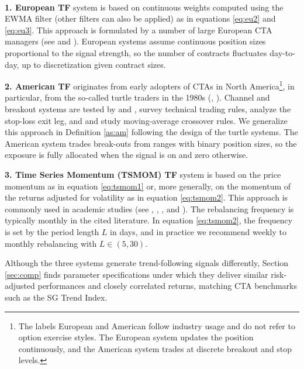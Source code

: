 \documentclass[hidelinks]{siamonline250211}
\begin{document}
\begin{definition} ~
	
	\textbf{1. European TF} system is based on continuous weights computed using the EWMA filter (other filters can also be applied) as in equations \eqref{eq:eu2} and \eqref{eq:eu3}. This approach is formulated by a number of large European CTA managers (see \cite{Bouchaud2017} and \cite{Baz2015}). European systems assume continuous position sizes proportional to the signal strength, so the number of contracts fluctuates day-to-day, up to discretization given contract sizes.
	
	\textbf{2. American TF} originates from early adopters of CTAs in North America\footnote{The labels European and American follow industry usage and do not refer to option exercise styles. The European system updates the position continuously, and the American system trades at discrete breakout and stop levels.}, in particular, from the so-called turtle traders in the 1980s (\citealp{Covel2009}, \citealp{Curtis2007}). Channel and breakout systems are tested by \cite{Lukac1988} and \cite{Szakmary2010}, \cite{ParkIrwin2007} survey technical trading rules, \cite{KaminskiLo2014} analyze the stop-loss exit leg, and \cite{LevinePedersen2016} and \cite{Brock1992} study moving-average crossover rules. 
	We generalize this approach in Definition \ref{as:am} following the design of the turtle systems. The American system trades break-outs from ranges with binary position sizes, so the exposure is fully allocated when the signal is on and zero otherwise. 
	
	
	\textbf{3. Time Series Momentum (TSMOM) TF} system is based on the price momentum as in equation \eqref{eq:tsmom1} or, more generally, on the momentum of the returns adjusted for volatility as in equation \eqref{eq:tsmom2}. This approach is commonly used in academic studies (see \cite{Moskowitz2012}, \cite{Hurst2013}, \cite{Baltas2015}, and \cite{Dudler2015}). The rebalancing frequency is typically monthly in the cited literature. In equation \eqref{eq:tsmom2}, the frequency is set by the period length $L$ in days, and in practice we recommend weekly to monthly rebalancing with $L\in(5, 30)$.
	
\end{definition}


Although the three systems generate trend-following signals differently, Section \ref{sec:comp} finds parameter specifications under which they deliver similar risk-adjusted performances and closely correlated returns, matching CTA benchmarks such as the SG Trend Index.
\end{document}
